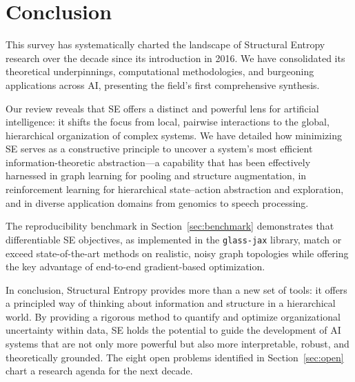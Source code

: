\section{Conclusion}
\label{sec:conclusion}

This survey has systematically charted the landscape of Structural Entropy
research over the decade since its introduction in 2016.
We have consolidated its theoretical underpinnings, computational
methodologies, and burgeoning applications across AI, presenting the field's
first comprehensive synthesis.

Our review reveals that SE offers a distinct and powerful lens for artificial
intelligence: it shifts the focus from local, pairwise interactions to the
global, hierarchical organization of complex systems.
We have detailed how minimizing SE serves as a constructive principle to
uncover a system's most efficient information-theoretic abstraction---a
capability that has been effectively harnessed in graph learning for pooling
and structure augmentation, in reinforcement learning for hierarchical
state--action abstraction and exploration, and in diverse application domains
from genomics to speech processing.

The reproducibility benchmark in Section~\ref{sec:benchmark} demonstrates
that differentiable SE objectives, as implemented in the \texttt{glass-jax}
library, match or exceed state-of-the-art methods on realistic, noisy graph
topologies while offering the key advantage of end-to-end gradient-based
optimization.

In conclusion, Structural Entropy provides more than a new set of tools: it
offers a principled way of thinking about information and structure in a
hierarchical world.
By providing a rigorous method to quantify and optimize organizational
uncertainty within data, SE holds the potential to guide the development of AI
systems that are not only more powerful but also more interpretable, robust,
and theoretically grounded.
The eight open problems identified in Section~\ref{sec:open} chart a research
agenda for the next decade.


